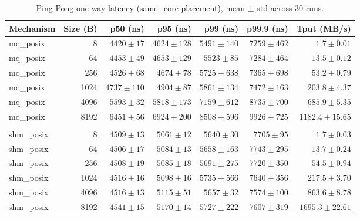 \begin{table}[!t]
\centering
\caption{Ping-Pong one-way latency (same_core placement), mean $\pm$ std across 30 runs.}
\label{tab:pp_latency_same_core}
\begin{tabular}{lrrrrrr}
\toprule
\textbf{Mechanism} & \textbf{Size (B)} & \textbf{p50 (ns)} & \textbf{p95 (ns)} & \textbf{p99 (ns)} & \textbf{p99.9 (ns)} & \textbf{Tput (MB/s)} \\
\midrule
mq_posix & 8 & $4420 \pm 17$ & $4624 \pm 128$ & $5491 \pm 140$ & $7259 \pm 462$ & $1.7 \pm 0.01$ \\
mq_posix & 64 & $4453 \pm 49$ & $4653 \pm 129$ & $5523 \pm 85$ & $7284 \pm 464$ & $13.5 \pm 0.12$ \\
mq_posix & 256 & $4526 \pm 68$ & $4674 \pm 78$ & $5725 \pm 638$ & $7365 \pm 698$ & $53.2 \pm 0.79$ \\
mq_posix & 1024 & $4737 \pm 110$ & $4904 \pm 87$ & $5861 \pm 134$ & $7472 \pm 163$ & $203.8 \pm 4.37$ \\
mq_posix & 4096 & $5593 \pm 32$ & $5818 \pm 173$ & $7159 \pm 612$ & $8735 \pm 700$ & $685.9 \pm 5.35$ \\
mq_posix & 8192 & $6451 \pm 56$ & $6924 \pm 200$ & $8508 \pm 596$ & $9926 \pm 725$ & $1182.4 \pm 15.65$ \\
 &  &  &  &  &  &  \\
shm_posix & 8 & $4509 \pm 13$ & $5061 \pm 12$ & $5640 \pm 30$ & $7705 \pm 95$ & $1.7 \pm 0.03$ \\
shm_posix & 64 & $4506 \pm 17$ & $5084 \pm 13$ & $5658 \pm 163$ & $7743 \pm 295$ & $13.7 \pm 0.24$ \\
shm_posix & 256 & $4508 \pm 19$ & $5085 \pm 18$ & $5691 \pm 275$ & $7720 \pm 350$ & $54.5 \pm 0.94$ \\
shm_posix & 1024 & $4516 \pm 16$ & $5098 \pm 16$ & $5735 \pm 566$ & $7640 \pm 356$ & $217.5 \pm 3.70$ \\
shm_posix & 4096 & $4516 \pm 13$ & $5115 \pm 51$ & $5657 \pm 32$ & $7574 \pm 100$ & $863.6 \pm 8.78$ \\
shm_posix & 8192 & $4541 \pm 15$ & $5170 \pm 14$ & $5727 \pm 222$ & $7607 \pm 319$ & $1695.3 \pm 22.61$ \\
\bottomrule
\end{tabular}
\end{table}
